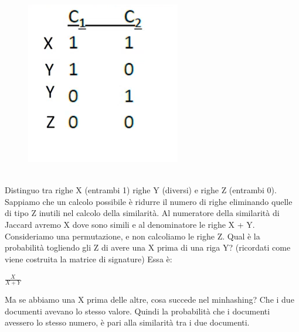 \begin{figure}[th]
    \centering
    \includegraphics[scale=0.5]{FrequentItems/img/c1c2.png}
\end{figure}
\\
Distinguo tra righe X (entrambi 1) righe Y (diversi) e righe Z (entrambi 0). Sappiamo che un calcolo possibile è ridurre il numero di righe eliminando quelle di tipo Z inutili nel calcolo della similarità. Al numeratore della similarità di Jaccard avremo X dove sono simili e al denominatore le righe X + Y. 
\\
Consideriamo una permutazione, e non calcoliamo le righe Z. Qual è la probabilità togliendo gli Z di avere una X prima di una riga Y? (ricordati come viene costruita la matrice di signature) Essa è: 
\begin{center}
    $\frac{X}{X+Y}$ 
\end{center}
Ma se abbiamo una X prima delle altre, cosa succede nel minhashing? Che i due documenti avevano lo stesso valore. Quindi la probabilità che i documenti avessero lo stesso numero, è pari alla similarità tra i due documenti.

